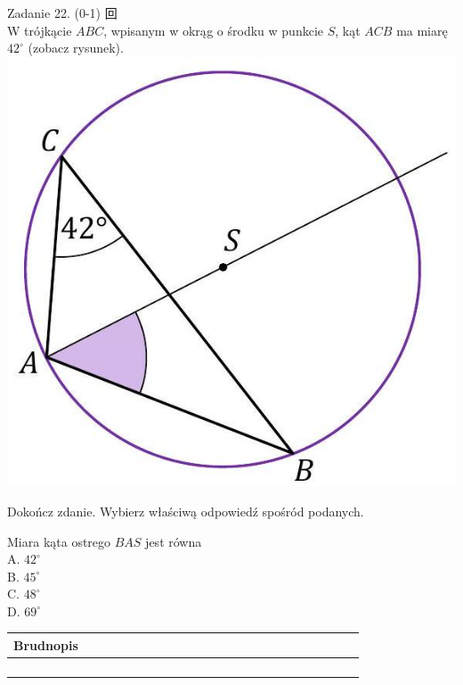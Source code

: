 \documentclass[10pt]{article}
\begin{document}
Zadanie 22. (0-1) 回\\
W trójkącie \(A B C\), wpisanym w okrąg o środku w punkcie \(S\), kąt \(A C B\) ma miarę \(42^{\circ}\) (zobacz rysunek).\\
\includegraphics[max width=\textwidth, center]{2024_11_21_daeb5e5efb43dd4cb535g-20}

Dokończ zdanie. Wybierz właściwą odpowiedź spośród podanych.

Miara kąta ostrego \(B A S\) jest równa\\
A. \(42^{\circ}\)\\
B. \(45^{\circ}\)\\
C. \(48^{\circ}\)\\
D. \(69^{\circ}\)

\begin{center}
\begin{tabular}{|c|c|c|c|c|c|c|c|c|c|c|c|c|c|c|c|c|c|c|c|c|c|c|c|c|c|}
\hline
\multicolumn{4}{|l|}{Brudnopis} &  &  &  &  &  &  &  &  &  &  &  &  &  &  &  &  &  &  &  &  &  &  \\
\hline
 &  &  &  &  &  &  &  &  &  &  &  &  &  &  &  &  &  &  &  &  &  &  &  &  &  \\
\hline
 &  &  &  &  &  &  &  &  &  &  &  &  &  &  &  &  &  &  &  &  &  &  &  &  &  \\
\hline
 &  &  &  &  &  &  &  &  &  &  &  &  &  &  &  &  &  &  &  &  &  &  &  &  &  \\
\hline
 &  &  &  &  &  &  &  &  &  &  &  &  &  &  &  &  &  &  &  &  &  &  &  &  &  \\
\hline
\end{tabular}
\end{center}
\end{document}
